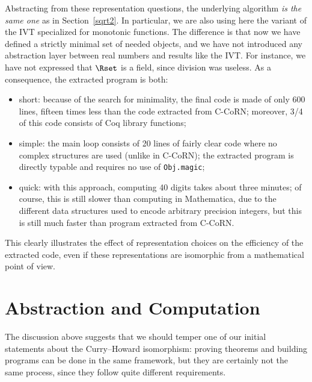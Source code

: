 \documentclass{entcs}
\begin{document}

\bigskip\noindent
Abstracting from these representation questions,
the underlying algorithm \emph{is the same one} as in Section~\ref{sqrt2}.
In particular, we are also using here the variant of the IVT
specialized for monotonic functions. The difference is that now we have
defined a
strictly minimal set of needed objects, and we have not introduced any
abstraction layer between real numbers and results like the IVT. For
instance, we have not expressed that $\Rset$ is a field, since division
was useless. As a consequence, the extracted program is both: 
\begin{itemize}
\item short: because of the search for minimality, the final code is
  made of only 600 lines, fifteen times less than the code extracted from C-CoRN;
  moreover, 3/4 of this code consists of Coq library functions; 
\item simple: the main loop consists of 20 lines of fairly clear code
  where no complex structures are used (unlike in C-CoRN); the extracted
  program is directly typable and requires no use of \texttt{Obj.magic};
\item quick: with this approach, computing 40 digits takes about three
  minutes; of course, this is still slower than computing in
  Mathematica, due to the different data structures used to encode arbitrary
  precision integers, but this is still much faster than program
  extracted from C-CoRN.
\end{itemize}

This clearly illustrates the effect of representation choices on the
efficiency of the extracted code, even if these representations are
isomorphic from a mathematical point of view.


\section{Abstraction and Computation}\label{proofcomp}

The discussion above suggests that we should temper one of our initial
statements about the Curry--Howard isomorphism: proving theorems and
building programs can be done in the same framework, but they
are certainly not the same process, since they follow quite different
requirements.
\end{document}
